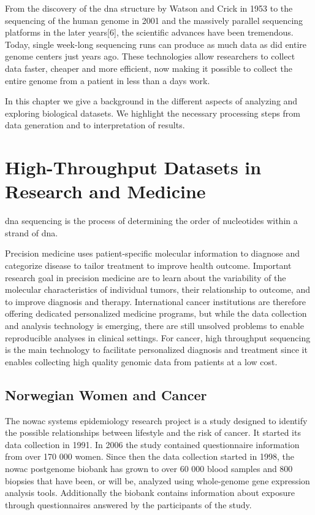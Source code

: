 From the discovery of the \gls{dna} structure by Watson and Crick in
1953\cite{watson1953molecular} to
the sequencing of the human genome in 2001
\cite{venter2001sequence,international2001initial} and the massively parallel
sequencing platforms in the later years[6], the scientific advances have been
tremendous. Today, single week-long sequencing runs can produce as much data as
did entire genome centers just years ago.\cite{kahn2011future}  These
technologies allow researchers to collect data faster, cheaper and more
efficient, now making it possible to collect the entire genome from a patient in
less than a days work.

In this chapter we give a background in the different aspects of analyzing and
exploring biological datasets. We highlight the necessary processing steps from
data generation and to interpretation of results. 

\section{High-Throughput Datasets in Research and Medicine} 
\gls{dna} sequencing is the process of determining the order of nucleotides
within a strand of \gls{dna}. 


Precision medicine uses patient-specific molecular information to diagnose and
categorize disease to tailor treatment to improve health
outcome.\cite{national2011toward} Important research goal in precision medicine
are to learn about the variability of the molecular characteristics of
individual tumors, their relationship to outcome, and to improve diagnosis and
therapy.\cite{tannock2016limits} International cancer institutions are therefore
offering dedicated personalized medicine programs, but while the data collection
and analysis technology is emerging, there are still unsolved problems to enable
reproducible analyses in clinical settings. For cancer, high throughput
sequencing is the main technology to facilitate personalized diagnosis and
treatment since it enables collecting high quality genomic data from patients
at a low cost. 

\subsection{Norwegian Women and Cancer} 
The \gls{nowac} systems epidemiology research project is a study designed to
identify the possible relationships between lifestyle and the risk of cancer.
It started its data collection in 1991. In 2006 the study contained
questionnaire information from over 170 000 women. Since then the data
collection started in 1998, the \gls{nowac} postgenome biobank has grown to over
60 000 blood samples and 800 biopsies that have been, or will be, analyzed using
whole-genome gene expression analysis tools. Additionally the biobank contains
information about exposure through questionnaires answered by the participants
of the study.

